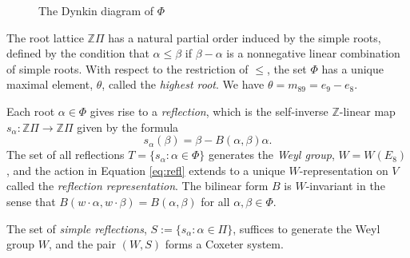 \documentclass[10pt,a4paper]{amsart}
\numberwithin{equation}{section}
\newcommand{\al}{\alpha}
\newcommand{\be}{\beta}
\newcommand{\Z}{{\mathbb Z}}
\newcommand{\ra}{\rightarrow}
\newcommand{\simproots}{\Pi}
\newcommand{\allroots}{\Phi}
\newcommand{\mr}{m}
\begin{document}
\begin{figure}[!h]%
\centering
{}
\caption{The Dynkin diagram of $\Phi$}%
\label{fig:dynkin}
\end{figure}

The root lattice $\Z\Pi$ has a natural partial order induced by the simple
roots, defined by the condition that $\al \leq \be$ if $\be - \al$ is a
nonnegative linear combination of simple roots. With respect to the restriction
of $\le$, the set $\Phi$ has a unique maximal element, $\theta$, called the
\emph{highest root}. We have $\theta=\mr_{89} =  e_9 - e_8$.

Each root $\al \in \allroots$ gives rise to a \emph{reflection}, which is the
self-inverse $\Z$-linear map $s_\alpha: \Z\Pi\ra \Z\Pi$ given by the formula
\begin{equation} \label{eq:refl} s_\al(\be) = \be - B(\al, \be)\al.
\end{equation} The set of all reflections $T=\{s_\al: \al\in \Phi\}$ generates
the \emph{Weyl group}, $W=W(E_8)$, and the action in Equation \eqref{eq:refl}
extends to a unique $W$-representation on $V$ called the \emph{reflection
representation}. The bilinear form $B$ is $W$-invariant in the sense that
$B(w\cdot \al,w\cdot \be)=B(\al,\be)$ for all $\al,\be\in \Phi$. 

The set of \emph{simple reflections}, $S := \{s_\al : \al \in \simproots\}$,
suffices to generate the Weyl group $W$, and the pair $(W,S)$ forms a Coxeter
system. 
\end{document}
